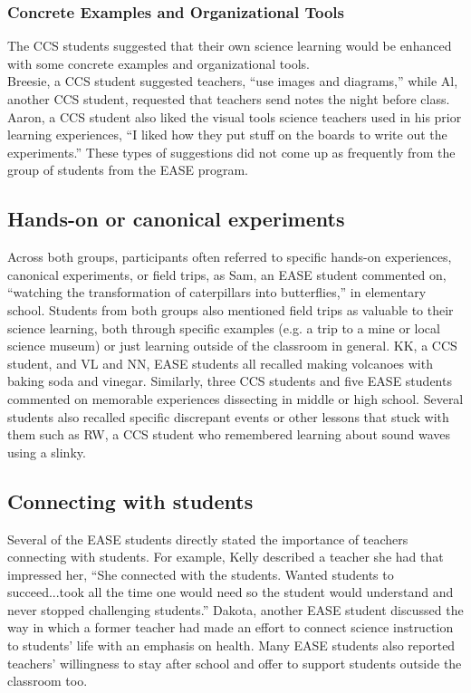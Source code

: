 \documentclass[11pt]{sig-alternate}
\begin{document}
\begin{large}
\subsubsection*{Concrete Examples and Organizational Tools}
The CCS students suggested that their own science learning would be enhanced with some concrete examples and organizational tools. \\Breesie, a CCS student suggested teachers, “use images and diagrams,” while Al, another CCS student, requested that teachers send notes the night before class. Aaron, a CCS student also liked the visual tools science teachers used in his prior learning experiences, “I liked how they put stuff on the boards to write out the experiments.” These types of suggestions did not come up as frequently from the group of students from the EASE program. 

\subsection*{Hands-on or canonical experiments}

Across both groups, participants often referred to specific hands-on experiences, canonical experiments, or field trips, as Sam, an EASE student commented on, “watching the transformation of caterpillars into butterflies,” in elementary school. Students from both groups also mentioned field trips as valuable to their science learning, both through specific examples (e.g. a trip to a mine or local science museum) or just learning outside of the classroom in general. KK, a CCS student, and VL and NN, EASE students all recalled making volcanoes with baking soda and vinegar. Similarly, three CCS students and five EASE students commented on memorable experiences dissecting in middle or high school. Several students also recalled specific discrepant events or other lessons that stuck with them such as RW, a CCS student who remembered learning about sound waves using a slinky. 

\subsection*{Connecting with students}

Several of the EASE students directly stated the importance of teachers connecting with students. For example, Kelly described a teacher she had that impressed her, “She connected with the students. Wanted students to succeed...took all the time one would need so the student would understand and never stopped challenging students.” Dakota, another EASE student discussed the way in which a former teacher had made an effort to connect science instruction to students’ life with an emphasis on health. Many EASE students also reported teachers’ willingness to stay after school and offer to support students outside the classroom too. 


\end{large}
\end{document}

